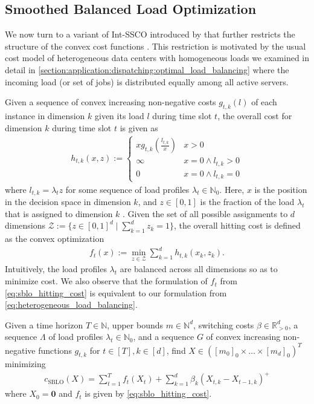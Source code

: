 \subsection{Smoothed Balanced Load Optimization}

We now turn to a variant of Int-SSCO introduced by \citeauthor*{Albers2021_2} that further restricts the structure of the convex cost functions \cite{Albers2021_2}. This restriction is motivated by the usual cost model of heterogeneous data centers with homogeneous loads we examined in detail in \autoref{section:application:dispatching:optimal_load_balancing} where the incoming load (or set of jobs) is distributed equally among all active servers.

Given a sequence of convex increasing non-negative costs $g_{t,k}(l)$ of each instance in dimension $k$ given its load $l$ during time slot $t$, the overall cost for dimension $k$ during time slot $t$ is given as \begin{align*}
    h_{t,k}(x,z) := \begin{cases}
        x g_{t,k}\left(\frac{l_{t,k}}{x}\right) & x > 0 \\
        \infty                                  & x = 0 \land l_{t,k} > 0 \\
        0                                       & x = 0 \land l_{t,k} = 0
    \end{cases}
\end{align*} where $l_{t,k} = \lambda_t z$ for some sequence of load profiles $\lambda_t \in \mathbb{N}_0$. Here, $x$ is the position in the decision space in dimension $k$, and $z \in [0,1]$ is the fraction of the load $\lambda_t$ that is assigned to dimension $k$ \cite{Albers2021_2}. Given the set of all possible assignments to $d$ dimensions $\mathcal{Z} := \{z \in [0,1]^d \mid \sum_{k=1}^d z_k = 1\}$, the overall hitting cost is defined as the convex optimization \begin{align}
\label{eq:sblo_hitting_cost}
    f_t(x) := \min_{z \in \mathcal{Z}} \sum_{k=1}^d h_{t,k}(x_k,z_k).
\end{align} Intuitively, the load profiles $\lambda_t$ are balanced across all dimensions so as to minimize cost. We also observe that the formulation of $f_t$ from \autoref{eq:sblo_hitting_cost} is equivalent to our formulation from \autoref{eq:heterogeneous_load_balancing}.

\begin{problem}\label{problem:sblo}
Given a time horizon $T \in \mathbb{N}$, upper bounds $m \in \mathbb{N}^d$, switching costs $\beta \in \mathbb{R}_{>0}^d$, a sequence $\Lambda$ of load profiles $\lambda_t \in \mathbb{N}_0$, and a sequence $G$ of convex increasing non-negative functions $g_{t,k}$ for $t \in [T], k \in [d]$, find $X \in ([m_0]_0 \times \dots \times [m_d]_0)^T$ minimizing \begin{align*}
    c_{\text{SBLO}}(X) = \sum_{t=1}^T f_t(X_t) + \sum_{k=1}^d \beta_k (X_{t,k} - X_{t-1,k})^+
\end{align*}
where $X_0 = \mathbf{0}$ and $f_t$ is given by \autoref{eq:sblo_hitting_cost}.
\end{problem}

